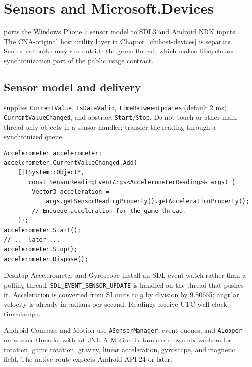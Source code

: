 \chapter{Sensors and Microsoft.Devices}
\label{ch:sensors}
\label{ch:devices-sensors}

 ports the Windows Phone 7 sensor model to SDL3 and Android
NDK inputs. The CNA-original host utility layer in Chapter~\ref{ch:host-devices} is separate.
Sensor callbacks may run outside the game thread, which makes lifecycle and synchronization part
of the public usage contract.

\section{Sensor model and delivery}

 supplies \texttt{CurrentValue}, \texttt{IsDataValid},
\texttt{TimeBetweenUpdates} (default 2 ms), \texttt{CurrentValueChanged}, and abstract
\texttt{Start}/\texttt{Stop}. Do not touch  or other main-thread-only
objects in a sensor handler; transfer the reading through a synchronized queue.

\begin{lstlisting}
Accelerometer accelerometer;
accelerometer.CurrentValueChanged.Add(
    [](System::Object*,
       const SensorReadingEventArgs<AccelerometerReading>& args) {
        Vector3 acceleration =
            args.getSensorReadingProperty().getAccelerationProperty();
        // Enqueue acceleration for the game thread.
    });
accelerometer.Start();
// ... later ...
accelerometer.Stop();
accelerometer.Dispose();
\end{lstlisting}

Desktop Accelerometer and Gyroscope install an SDL event watch rather than a polling thread.
\texttt{SDL\_EVENT\_SENSOR\_UPDATE} is handled on the thread that pushes it. Acceleration is
converted from SI units to $g$ by division by 9.80665; angular velocity is already in radians
per second. Readings receive UTC wall-clock timestamps.

Android Compass and Motion use \texttt{ASensorManager}, event queues, and \texttt{ALooper} on
worker threads, without JNI. A Motion instance can own six workers for rotation, game rotation,
gravity, linear acceleration, gyroscope, and magnetic field. The native route expects Android
API 24 or later.

